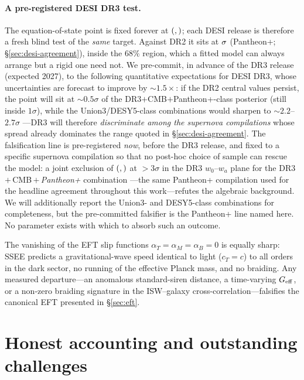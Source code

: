 \documentclass[a4paper,11pt]{article}
\begin{document}
\paragraph{A pre-registered DESI DR3 test.} The equation-of-state point is
fixed forever at $(\val{W0_d3},\val{WA_d3})$; each DESI release is therefore a fresh
blind test of the \emph{same} target. Against DR2 it sits at $\val{p2_w0wa_ssee_ec26}\sigma$
(Pantheon+; \S\ref{sec:desi-agreement}), inside the $68\%$ region, which a fitted
model can always arrange but a rigid one need not. We pre-commit, in advance of the DR3 release (expected
2027), to the following quantitative expectations for
DESI DR3, whose uncertainties are forecast to improve by ${\sim}1.5\times$:
if the DR2 central values persist, the point will sit at ${\sim}0.5\sigma$ of
the DR3$+$CMB$+$Pantheon+-class posterior (still inside $1\sigma$), while the
Union3/DESY5-class combinations would sharpen to ${\sim}2.2$--$2.7\sigma$
---DR3 will therefore \emph{discriminate among the supernova compilations}
whose spread already dominates the range quoted in \S\ref{sec:desi-agreement}.
The falsification line is pre-registered \emph{now}, before the DR3 release, and
fixed to a specific supernova compilation so that no post-hoc choice of sample can
rescue the model: a joint exclusion of $(\val{W0_d3},\val{WA_d3})$ at ${>}3\sigma$ in the
DR3 $w_0$--$w_a$ plane for the DR3\,$+$\,CMB\,$+$\,\emph{Pantheon+} combination
---the same Pantheon+ compilation used for the headline agreement throughout this
work---refutes the algebraic background. We will additionally report the
Union3- and DESY5-class combinations for completeness, but the pre-committed
falsifier is the Pantheon+ line named here. No parameter exists with which
to absorb such an outcome.

The vanishing of the EFT slip functions $\alpha_T=\alpha_M=\alpha_B=0$ is
equally sharp: SSEE predicts a gravitational-wave speed identical to light
($c_T=c$) to all orders in the dark sector, no running of the effective Planck
mass, and no braiding. Any measured departure---an anomalous standard-siren
distance, a time-varying $G_{\rm eff}$, or a non-zero braiding signature in the
ISW--galaxy cross-correlation---falsifies the canonical EFT presented in
\S\ref{sec:eft}.

\section{Honest accounting and outstanding challenges}
\label{sec:open}
\end{document}
